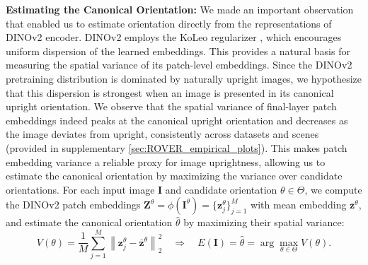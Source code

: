 \textbf{Estimating the Canonical Orientation:}
We made an important observation that enabled us to estimate orientation directly from the representations of DINOv2 encoder.
DINOv2 employs the KoLeo regularizer \citep{sablayrolles2018spreadingkoleoregularizer}, which encourages uniform dispersion of the learned embeddings.
This provides a natural basis for measuring the spatial variance of its patch-level embeddings.
Since the DINOv2 pretraining distribution is dominated by naturally upright images, we hypothesize that this dispersion is strongest when an image is presented in its canonical upright orientation.
We observe that the spatial variance of final-layer patch embeddings indeed peaks at the canonical upright orientation and decreases as the image deviates from upright, consistently across datasets and scenes (provided in supplementary \cref{sec:ROVER_empirical_plots}).
This makes patch embedding variance a reliable proxy for image uprightness, allowing us to estimate the canonical orientation by maximizing the variance over candidate orientations.
For each input image $\mathbf{I}$ and candidate orientation $\theta \in \Theta$, we compute the DINOv2 patch embeddings $\mathbf{Z}^{\theta}=\phi(\mathbf{I}^{\theta})=\{\mathbf{z}_j^\theta\}_{j=1}^{M}$ with mean embedding $\bar{\mathbf{z}}^\theta$, and estimate the canonical orientation $\hat{\theta}$ by maximizing their spatial variance:
\begin{equation*}
V(\theta) = \frac{1}{M}\sum_{j=1}^{M}
\left\|\mathbf{z}_j^\theta - \bar{\mathbf{z}}^\theta\right\|_2^2
\quad\Longrightarrow\quad
E(\mathbf{I}) = \hat{\theta} = \arg\max_{\theta \in \Theta} V(\theta).
\end{equation*}
\vspace{-2mm}

